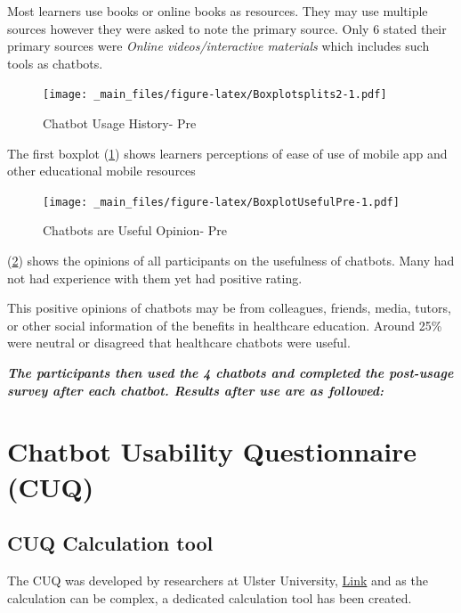 \documentclass[a4paper, nobind]{templates/ociamthesis}
\begin{document}
Most learners use books or online books as resources. They may use multiple sources however they were asked to note the primary source. Only 6 stated their primary sources were \emph{Online videos/interactive materials} which includes such tools as chatbots.

\begin{figure}
\centering
\texttt{[image: \_main\_files/figure-latex/Boxplotsplits2-1.pdf]}
\caption{\label{fig:Boxplotsplits2}Chatbot Usage History- Pre}
\end{figure}

The first boxplot (\ref{fig:Boxplotsplits2}) shows learners perceptions of ease of use of mobile app and other educational mobile resources

\begin{figure}
\centering
\texttt{[image: \_main\_files/figure-latex/BoxplotUsefulPre-1.pdf]}
\caption{\label{fig:BoxplotUsefulPre}Chatbots are Useful Opinion- Pre}
\end{figure}

(\ref{fig:BoxplotUsefulPre}) shows the opinions of all participants on the usefulness of chatbots. Many had not had experience with them yet had positive rating.

This positive opinions of chatbots may be from colleagues, friends, media, tutors, or other social information of the benefits in healthcare education. Around 25\% were neutral or disagreed that healthcare chatbots were useful.

\textbf{\emph{The participants then used the 4 chatbots and completed the post-usage survey after each chatbot. Results after use are as followed:}}

\hypertarget{chatbot-usability-questionnaire-cuq-1}{%
\section{Chatbot Usability Questionnaire (CUQ)}\label{chatbot-usability-questionnaire-cuq-1}}

\hypertarget{cuq-calculation-tool}{%
\subsection{CUQ Calculation tool}\label{cuq-calculation-tool}}

The CUQ was developed by researchers at Ulster University,
\href{https://www.ulster.ac.uk/research/topic/computer-science/artificial-intelligence/projects/cuq}{Link}
and as the calculation can be complex, a dedicated calculation tool has been created.
\end{document}
